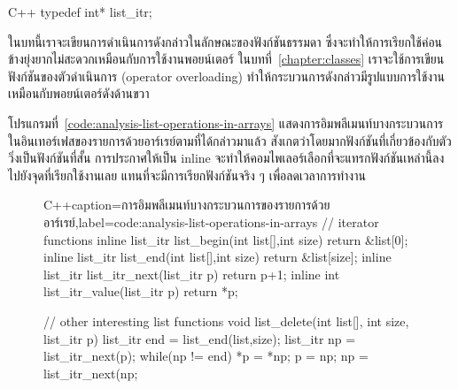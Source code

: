 \latintext
\begin{codelist}{C++}{}
typedef int* list_itr;
\end{codelist}
\thaitext

ใน{\wbr}บท{\wbr}นี้{\wbr}เรา{\wbr}จะ{\wbr}เขียน{\wbr}การ{\wbr}ดำเนินการ{\wbr}ดังกล่าว{\wbr}ใน{\wbr}ลักษณะ{\wbr}ของ{\wbr}ฟังก์ชัน{\wbr}ธรรมดา{\wbr}
ซึ่ง{\wbr}จะ{\wbr}ทำ{\wbr}ให้การ{\wbr}เรียก{\wbr}ใช้{\wbr}ค่อนข้าง{\wbr}ยุ่งยาก{\wbr}ไม่{\wbr}สะดวก{\wbr}เหมือน{\wbr}กับ{\wbr}การ{\wbr}ใช้{\wbr}งาน{\wbr}พอยน์เตอร์
ใน{\wbr}บท{\wbr}ที่~\ref{chapter:classes} เรา{\wbr}จะ{\wbr}ใช้{\wbr}การ{\wbr}เขียน{\wbr}ฟังก์ชัน{\wbr}ของ{\wbr}ตัวดำเนินการ (operator
overloading) ทำ{\wbr}ให้{\wbr}กระบวนการ{\wbr}ดังกล่าว{\wbr}มี{\wbr}รูปแบบ{\wbr}การ{\wbr}ใช้{\wbr}งาน{\wbr}เหมือน{\wbr}กับ{\wbr}พอยน์เตอร์{\wbr}ดัง{\wbr}ด้าน{\wbr}ขวา{\wbr}

โปรแกรม{\wbr}ที่~\ref{code:analysis-list-operations-in-arrays}
แสดง{\wbr}การ{\wbr}อิม{\wbr}พลี{\wbr}เมนท์{\wbr}บาง{\wbr}กระบวนการ{\wbr}ใน{\wbr}อิน{\wbr}เทอร์เฟส{\wbr}ของ{\wbr}รายการ{\wbr}ด้วย{\wbr}อาร์เรย์{\wbr}ตาม{\wbr}ที่{\wbr}ได้{\wbr}กล่าว{\wbr}มา{\wbr}แล้ว{\wbr}
สังเกต{\wbr}ว่า{\wbr}โดยมาก{\wbr}ฟังก์ชัน{\wbr}ที่{\wbr}เกี่ยวข้อง{\wbr}กับ{\wbr}ตัว{\wbr}วิ่ง{\wbr}เป็น{\wbr}ฟังก์ชัน{\wbr}ที่{\wbr}สั้น การ{\wbr}ประกาศ{\wbr}ให้{\wbr}เป็น {\ct
  inline} จะ{\wbr}ทำ{\wbr}ให้{\wbr}คอม{\wbr}ไพ{\wbr}เลอร์{\wbr}เลือก{\wbr}ที่{\wbr}จะ{\wbr}แทรก{\wbr}ฟังก์ชัน{\wbr}เหล่านี้{\wbr}ลง{\wbr}ไป{\wbr}ยัง{\wbr}จุด{\wbr}ที่{\wbr}เรียก{\wbr}ใช้{\wbr}งาน{\wbr}เลย{\wbr}
แทน{\wbr}ที่{\wbr}จะ{\wbr}มี{\wbr}การ{\wbr}เรียก{\wbr}ฟังก์ชัน{\wbr}จริง ๆ เพื่อ{\wbr}ลด{\wbr}เวลา{\wbr}การ{\wbr}ทำงาน{\wbr}

\begin{figure}
\latintext
\begin{codelist}{C++}{caption={\thaitext การ{\wbr}อิม{\wbr}พลี{\wbr}เมนท์{\wbr}บาง{\wbr}กระบวนการ{\wbr}ของ{\wbr}รายการ{\wbr}ด้วย{\wbr}อาร์เรย์\latintext},label=code:analysis-list-operations-in-arrays}
// iterator functions
inline list_itr list_begin(int list[],int size) {return &list[0];}
inline list_itr list_end(int list[],int size) {return &list[size];}
inline list_itr list_itr_next(list_itr p) { return p+1; }
inline int list_itr_value(list_itr p) { return *p; }

// other interesting list functions
void list_delete(int list[], int size, list_itr p)
{
  list_itr end = list_end(list,size);
  list_itr np = list_itr_next(p);
  while(np != end) {
    *p = *np;
    p = np;
    np = list_itr_next(np;
  }
}
\end{codelist}
\thaitext
\end{figure}


